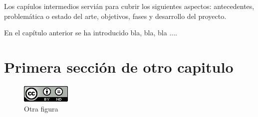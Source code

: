 Los capíulos intermedios servián para cubrir los siguientes aspectos: antecedentes, problemática o estado del arte, objetivos, fases y desarrollo del proyecto.

\bigskip
En el capítulo anterior se ha introducido bla, bla, bla ....

\section{Primera sección de otro capitulo}

\begin{figure}[htb]
   \centering
   \includegraphics[width=0.5\linewidth]{figures/by-nd_88x31}
   \caption{Otra figura}
   \label{chapter:stateOfTheArt}
\end{figure}
